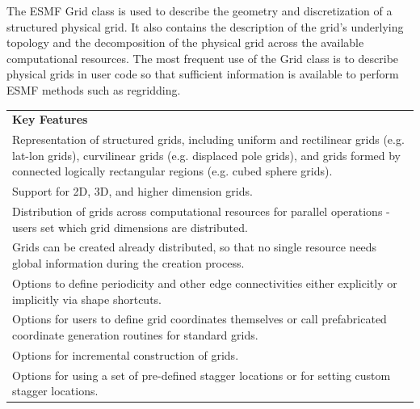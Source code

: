 %

The ESMF Grid class is used to describe the geometry and discretization
of a structured physical grid.  It also contains the description of the
grid's underlying topology and the decomposition of the physical grid
across the available computational resources.  The most frequent 
use of the Grid class is to describe physical grids in user
code so that sufficient information is available to perform ESMF
methods such as regridding.  

\begin{center}
\begin{tabular}{|p{6in}|}
\hline
\vspace{.01in}
{\bf Key Features} \\[.01in]
Representation of structured grids, including uniform and
rectilinear grids (e.g. lat-lon grids), curvilinear grids (e.g. displaced pole grids), 
and grids formed by connected logically rectangular regions (e.g. cubed
sphere grids).\\
Support for 2D, 3D, and higher dimension grids.\\ 
Distribution of grids across computational resources for parallel
operations - users set which grid dimensions are distributed.\\
Grids can be created already distributed, so that no single
resource needs global information during the creation process.\\
Options to define periodicity and other edge connectivities either 
explicitly or implicitly via shape shortcuts.\\ 
Options for users to define grid coordinates themselves or call
prefabricated coordinate generation routines for standard grids.\\
Options for incremental construction of grids.\\
Options for using a set of pre-defined stagger locations or for setting
custom stagger locations.\\ [.03in] \hline
\end{tabular}
\end{center}


